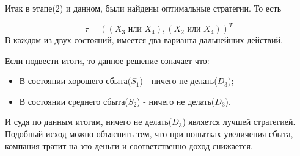 Итак в этапе(2) и данном, были найдены оптимальные стратегии. То есть

\begin{equation*}
\tau=((X_3 \textit{ или } X_4), (X_2 \textit{ или } X_4))^T
\end{equation*}
В каждом из двух состояний, имеется два варианта дальнейших действий.

Если подвести итоги, то данное решение означает что:
\begin{itemize}
\item В состоянии хорошего сбыта($S_1$) - ничего не делать($D_3$);
\item В состоянии среднего сбыта($S_2$) - ничего не делать($D_3$).
\end{itemize}
И судя по данным итогам, ничего не делать($D_3$) является лучшей стратегией. Подобный исход можно объяснить тем, что при попытках увеличения сбыта, компания тратит на это деньги и соответственно доход снижается.


%
%


%
%

